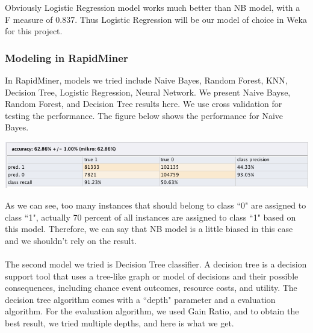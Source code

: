 \documentclass[CEJM,PDF]{cej} %
\begin{document}
Obviously Logistic Regression model works much better than NB model, with a F measure of 0.837. Thus Logistic Regression will be our model of choice in Weka for this project.\\

\subsubsection{Modeling in RapidMiner}
In RapidMiner, models we tried include Naive Bayes, Random Forest, KNN, Decision Tree, Logistic Regression, Neural Network. We present Naive Bayse, Random Forest, and Decision Tree results here. We use cross validation for testing the performance. 
The figure below shows the performance for Naive Bayes.
\begin{center}
\includegraphics[scale=0.5]{01_bayse_performance.png}
\end{center} 
As we can see, too many instances that should belong to class ``0" are assigned to class ``1", actually 70 percent of all instances are assigned to class ``1" based on this model. Therefore, we can say that NB model is a little biased in this case and we shouldn't rely on the result.\\
\\
The second model we tried is Decision Tree classifier. A decision tree is a decision support tool that uses a tree-like graph or model of decisions and their possible consequences, including chance event outcomes, resource costs, and utility. The decision tree algorithm comes with a ``depth" parameter and a evaluation algorithm. For the evaluation algorithm, we used Gain Ratio, and to obtain the best result, we tried multiple depths, and here is what we get.
\end{document}
